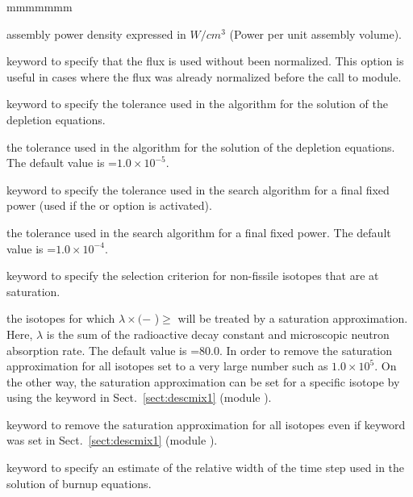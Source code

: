 \begin{ListeDeDescription}{mmmmmmm}
\item[\dusa{apower}] assembly power density expressed in $W/cm^3$ (Power per
unit assembly volume).

\item[\moc{KEEP}] keyword to specify that the flux is used without been normalized.
This option is useful in cases where the flux was already normalized before the call to
 module.

\item[\moc{EPS1}] keyword to specify the tolerance used in the algorithm for
the solution of the depletion equations.

\item[\dusa{valeps1}] the tolerance used in the algorithm for the solution of the
depletion equations. The default value is =$1.0\times 10^{-5}$.

\item[\moc{EPS2}] keyword to specify the tolerance used in the search
algorithm for a final fixed power (used if the  or  option is activated).

\item[\dusa{valeps2}] the tolerance used in the search algorithm for a final
fixed power. The default value is =$1.0\times 10^{-4}$.

\item[\moc{EXPM}] keyword to specify the selection criterion for non-fissile
isotopes that are at saturation.

\item[\dusa{valexp}] the isotopes for which $\lambda \times($$-$
)$ \ge $ will be treated by a saturation approximation. Here,
$\lambda$ is the sum of the radioactive decay constant and microscopic neutron
absorption rate. The default value is =80.0. In order to remove the
saturation approximation for all isotopes set  to a very large number
such as $1.0\times 10^{5}$. On the other way, the saturation approximation can be set
for a specific isotope by using the keyword  in Sect.~\ref{sect:descmix1}
(module ).

\item[\moc{SATOFF}] keyword to remove the saturation approximation for all isotopes
even if  keyword was set in Sect.~\ref{sect:descmix1} (module ).

\item[\moc{H1}] keyword to specify an estimate of the relative width of the
time step used in the solution of burnup equations.


\end{ListeDeDescription}
